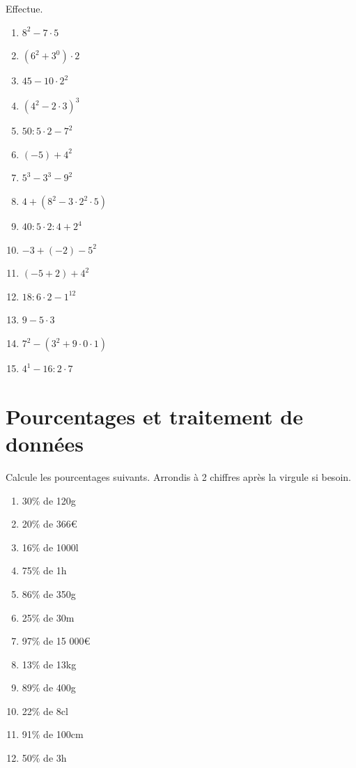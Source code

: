 \documentclass[10pt,a4paper]{article}
\begin{document}
\begin{exercise}
	Effectue.
		\begin{enumerate}[cols=3]
		\item $8^2 - 7 \cdot 5$
		\item $(6^2 + 3^0)\cdot 2$
		\item $45-10\cdot2^2$
		\item $(4^2 - 2\cdot 3)^3$
		\item $50:5\cdot2 - 7^2$
		\item $(-5)+4^2$
		\item $5^3 - 3^3 - 9^2$
		\item $4+(8^2 - 3 \cdot2^2 \cdot5)$
		\item $40:5\cdot2 : 4 + 2^4$
		\item $-3 + (-2) - 5^2$
		\item $(-5+2) + 4^2$
		\item $18:6\cdot 2 -1^{12}$
		\item $9-5\cdot 3$
		\item $7^2 - (3^2 + 9 \cdot 0 \cdot 1)$
		\item $4^1 - 16:2\cdot 7$
		\end{enumerate}
\end{exercise}

\section{Pourcentages et traitement de données}

\begin{exercise}
	Calcule les pourcentages suivants. Arrondis à 2 chiffres après la virgule si besoin. 
	\begin{enumerate}[cols=3]
		\item 30\% de 120g
		\item 20\% de 366€
		\item 16\% de 1000l
		\item 75\% de 1h
		\item 86\% de 350g
		\item 25\% de 30m
		\item 97\% de 15 000€
		\item 13\% de 13kg
		\item 89\% de 400g
		\item 22\% de 8cl 
		\item 91\% de 100cm
		\item 50\% de 3h
	\end{enumerate}
\end{exercise}
\end{document}

